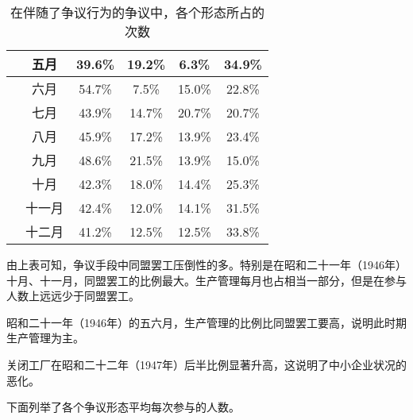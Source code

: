 \documentclass[a4paper,12pt]{article}
\begin{document}
\begin{table}
\begin{tabular}{|c|c|c|c|c|c|}
    \hline
                           & 五月 & 39.6\%   & 19.2\%   &  6.3\%   & 34.9\%   \\ 
    \hline
                           & 六月 & 54.7\%   &  7.5\%   & 15.0\%   & 22.8\%   \\ 
    \hline
                           & 七月 & 43.9\%   & 14.7\%   & 20.7\%   & 20.7\%   \\ 
    \hline
                           & 八月 & 45.9\%   & 17.2\%   & 13.9\%   & 23.4\%   \\ 
    \hline
                           & 九月 & 48.6\%   & 21.5\%   & 13.9\%   & 15.0\%   \\ 
    \hline
                           & 十月 & 42.3\%   & 18.0\%   & 14.4\%   & 25.3\%   \\
    \hline
                         & 十一月 & 42.4\%   & 12.0\%   & 14.1\%   & 31.5\%   \\ 
    \hline
                         & 十二月 & 41.2\%   & 12.5\%   & 12.5\%   & 33.8\%   \\ 
    \hline
  \end{tabular}
  \caption{在伴随了争议行为的争议中，各个形态所占的次数}
\end{table}

由上表可知，争议手段中同盟罢工压倒性的多。特别是在昭和二十一年（1946年）十月、十一月，同盟罢工的比例最大。生产管理每月也占相当一部分，但是在参与人数上远远少于同盟罢工。

昭和二十一年（1946年）的五六月，生产管理的比例比同盟罢工要高，说明此时期生产管理为主。

关闭工厂在昭和二十二年（1947年）后半比例显著升高，这说明了中小企业状况的恶化。

下面列举了各个争议形态平均每次参与的人数。
\end{document}
